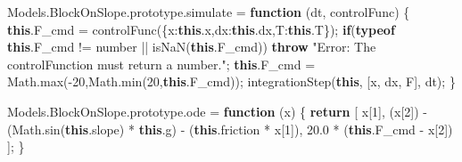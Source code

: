 \documentclass[
  8pt,
  a4paper,
]{book}
\newenvironment{Shaded}{\begin{snugshade}}{\end{snugshade}}
\newcommand{\AttributeTok}[1]{\textcolor[rgb]{0.40,0.45,0.13}{#1}}
\newcommand{\BuiltInTok}[1]{\textcolor[rgb]{0.00,0.23,0.31}{#1}}
\newcommand{\ControlFlowTok}[1]{\textcolor[rgb]{0.00,0.23,0.31}{\textbf{#1}}}
\newcommand{\DataTypeTok}[1]{\textcolor[rgb]{0.68,0.00,0.00}{#1}}
\newcommand{\DecValTok}[1]{\textcolor[rgb]{0.68,0.00,0.00}{#1}}
\newcommand{\FloatTok}[1]{\textcolor[rgb]{0.68,0.00,0.00}{#1}}
\newcommand{\FunctionTok}[1]{\textcolor[rgb]{0.28,0.35,0.67}{#1}}
\newcommand{\KeywordTok}[1]{\textcolor[rgb]{0.00,0.23,0.31}{\textbf{#1}}}
\newcommand{\NormalTok}[1]{\textcolor[rgb]{0.00,0.23,0.31}{#1}}
\newcommand{\OperatorTok}[1]{\textcolor[rgb]{0.37,0.37,0.37}{#1}}
\newcommand{\PreprocessorTok}[1]{\textcolor[rgb]{0.68,0.00,0.00}{#1}}
\newcommand{\StringTok}[1]{\textcolor[rgb]{0.13,0.47,0.30}{#1}}
\newcommand*\circled[1]{\tikz[baseline=(char.base)]{
          \node[shape=circle,draw,inner sep=1pt] (char) {{\scriptsize#1}};}}
\begin{document}
\begin{codelisting}
\begin{Shaded}
\begin{Highlighting}[]
\NormalTok{Models}\OperatorTok{.}\AttributeTok{BlockOnSlope}\OperatorTok{.}\AttributeTok{prototype}\OperatorTok{.}\AttributeTok{simulate} \OperatorTok{=} \KeywordTok{function}\NormalTok{ (dt}\OperatorTok{,}\NormalTok{ controlFunc)}
\NormalTok{\{}
    \KeywordTok{this}\OperatorTok{.}\AttributeTok{F\_cmd} \OperatorTok{=} \FunctionTok{controlFunc}\NormalTok{(\{}\DataTypeTok{x}\OperatorTok{:}\KeywordTok{this}\OperatorTok{.}\AttributeTok{x}\OperatorTok{,}\DataTypeTok{dx}\OperatorTok{:}\KeywordTok{this}\OperatorTok{.}\AttributeTok{dx}\OperatorTok{,}\DataTypeTok{T}\OperatorTok{:}\KeywordTok{this}\OperatorTok{.}\AttributeTok{T}\NormalTok{\})}\OperatorTok{;}
    \ControlFlowTok{if}\NormalTok{(}\KeywordTok{typeof} \KeywordTok{this}\OperatorTok{.}\AttributeTok{F\_cmd} \OperatorTok{!=} \StringTok{\textquotesingle{}number\textquotesingle{}} \OperatorTok{||} \PreprocessorTok{isNaN}\NormalTok{(}\KeywordTok{this}\OperatorTok{.}\AttributeTok{F\_cmd}\NormalTok{)) }\ControlFlowTok{throw} \StringTok{"Error: The controlFunction must return a number."}\OperatorTok{;}
    \KeywordTok{this}\OperatorTok{.}\AttributeTok{F\_cmd} \OperatorTok{=} \BuiltInTok{Math}\OperatorTok{.}\FunctionTok{max}\NormalTok{(}\OperatorTok{{-}}\DecValTok{20}\OperatorTok{,}\BuiltInTok{Math}\OperatorTok{.}\FunctionTok{min}\NormalTok{(}\DecValTok{20}\OperatorTok{,}\KeywordTok{this}\OperatorTok{.}\AttributeTok{F\_cmd}\NormalTok{))}\OperatorTok{;} \hspace*{\fill}\NormalTok{\circled{2}}
    \FunctionTok{integrationStep}\NormalTok{(}\KeywordTok{this}\OperatorTok{,}\NormalTok{ [}\StringTok{\textquotesingle{}x\textquotesingle{}}\OperatorTok{,} \StringTok{\textquotesingle{}dx\textquotesingle{}}\OperatorTok{,} \StringTok{\textquotesingle{}F\textquotesingle{}}\NormalTok{]}\OperatorTok{,}\NormalTok{ dt)}\OperatorTok{;}
\NormalTok{\}}

\NormalTok{Models}\OperatorTok{.}\AttributeTok{BlockOnSlope}\OperatorTok{.}\AttributeTok{prototype}\OperatorTok{.}\AttributeTok{ode} \OperatorTok{=} \KeywordTok{function}\NormalTok{ (x)}
\NormalTok{\{}
    \ControlFlowTok{return}\NormalTok{ [}
\NormalTok{        x[}\DecValTok{1}\NormalTok{]}\OperatorTok{,} \hspace*{\fill}\NormalTok{\circled{3}}
\NormalTok{        (x[}\DecValTok{2}\NormalTok{]) }\OperatorTok{{-}}\NormalTok{ (}\BuiltInTok{Math}\OperatorTok{.}\FunctionTok{sin}\NormalTok{(}\KeywordTok{this}\OperatorTok{.}\AttributeTok{slope}\NormalTok{) }\OperatorTok{*} \KeywordTok{this}\OperatorTok{.}\AttributeTok{g}\NormalTok{) }\OperatorTok{{-}}\NormalTok{ (}\KeywordTok{this}\OperatorTok{.}\AttributeTok{friction} \OperatorTok{*}\NormalTok{ x[}\DecValTok{1}\NormalTok{])}\OperatorTok{,} 
        \FloatTok{20.0} \OperatorTok{*}\NormalTok{ (}\KeywordTok{this}\OperatorTok{.}\AttributeTok{F\_cmd} \OperatorTok{{-}}\NormalTok{ x[}\DecValTok{2}\NormalTok{]) }
\NormalTok{    ]}\OperatorTok{;}
\NormalTok{\}}
\end{Highlighting}
\end{Shaded}

\end{codelisting}
\end{document}
